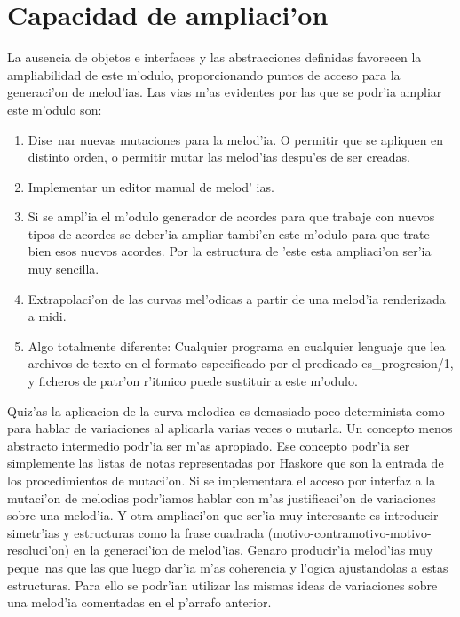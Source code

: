 \section {Capacidad de ampliaci'on}
La ausencia de objetos e interfaces y las abstracciones definidas favorecen la ampliabilidad de este m'odulo, proporcionando puntos de acceso para la generaci'on de melod'ias. Las vias m'as evidentes por las que se podr'ia ampliar este m'odulo son:
	\begin{enumerate}
	\item Dise~nar nuevas mutaciones para la melod'ia. O permitir que se apliquen en distinto orden, o permitir mutar las melod'ias despu'es de ser creadas.
	\item Implementar un editor manual de melod' ias.
	\item Si se ampl'ia el m'odulo generador de acordes para que trabaje con nuevos tipos de acordes se deber'ia ampliar tambi'en este m'odulo para que trate bien esos nuevos acordes. Por la estructura de 'este esta ampliaci'on ser'ia muy sencilla.
	\item Extrapolaci'on de las curvas mel'odicas a partir de una melod'ia renderizada a midi.
	\item Algo totalmente diferente: Cualquier programa en cualquier lenguaje que lea archivos de texto en el formato especificado por el predicado es\_progresion/1, y ficheros de patr'on r'itmico puede sustituir a este m'odulo.
	\end{enumerate}

Quiz'as la aplicacion de la curva melodica es demasiado poco determinista como para hablar de variaciones al aplicarla varias veces o mutarla. Un concepto menos abstracto intermedio podr'ia ser m'as apropiado. Ese concepto podr'ia ser simplemente las listas de notas representadas por Haskore que son la entrada de los procedimientos de mutaci'on. Si se implementara el acceso por interfaz a la mutaci'on de melodias podr'iamos hablar con m'as justificaci'on de variaciones sobre una melod'ia.\newline
Y otra ampliaci'on que ser'ia muy interesante es introducir simetr'ias y estructuras como la frase cuadrada (motivo-contramotivo-motivo-resoluci'on) en la generaci'ion de melod'ias. Genaro producir'ia melod'ias muy peque~nas que las que luego dar'ia m'as coherencia y l'ogica ajustandolas a estas estructuras. Para ello se podr'ian utilizar las mismas ideas de variaciones sobre una melod'ia comentadas en el p'arrafo anterior.
